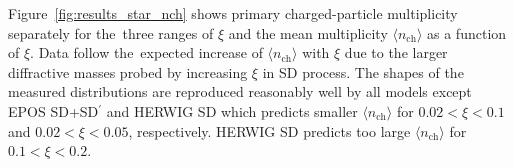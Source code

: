 Figure~\ref{fig:results_star_nch} shows primary charged-particle multiplicity  separately for the~three ranges of $\xi$ and the mean multiplicity $\langle n_\textrm{ch}\rangle$ as a function of $\xi$.  Data follow the~expected increase of  $\langle n_\textrm{ch}\rangle$ with $\xi$ due to the larger diffractive masses probed by increasing $\xi$ in SD process. The shapes of the measured distributions are reproduced reasonably well by all models except EPOS SD+SD$^\prime$ and HERWIG SD which predicts  smaller $\langle n_\textrm{ch}\rangle$  for $0.02<\xi<0.1$  and $0.02<\xi<0.05$, respectively. %
HERWIG SD predicts too large $\langle n_\textrm{ch}\rangle$ for $0.1<\xi<0.2$.


